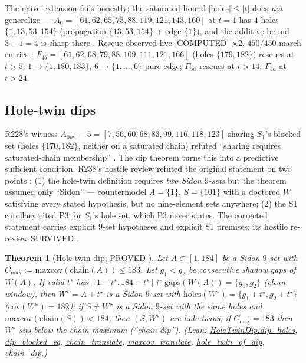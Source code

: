 \documentclass[11pt,a4paper]{article}
\newtheorem{theorem}{Theorem}
\theoremstyle{definition}
\begin{document}
The naive extension fails honestly: the saturated bound
$|\mathrm{holes}|\le|t|$ does \emph{not} generalize ---
$A_0=[61,62,65,73,88,119,121,143,160]$ at $t=1$ has $4$ holes
$\{1,13,53,154\}$ (propagation $\{13,53,154\}$ + edge $\{1\}$), and
the additive bound $3+1=4$ is sharp there \cite{D233}.
Rescue observed live [COMPUTED] $\times2$, $450/450$ march entries
\cite{D233}: $F_{4b}=[61,62,68,79,88,109,111,121,166]$ (holes
$\{179,182\}$) rescues at $t>5$: $1\!\to\!\{1,180,183\}$,
$6\!\to\!\{1,\dots,6\}$ pure edge; $F_{5a}$ rescues at $t>14$;
$F_{4a}$ at $t>24$.

\subsection{Hole-twin dips}
\label{sec:dip}

R228's witness $A_{0w1}-5=[7,56,60,68,83,99,116,118,123]$ sharing
$S_1$'s blocked set (holes $\{170,182\}$, neither on a saturated chain)
refuted ``sharing requires saturated-chain membership''
\cite{D231}. The dip theorem turns this into a predictive sufficient
condition. R238's hostile review refuted the original statement on two
points \cite{D238}: (1) the hole-twin definition requires \emph{two
Sidon $9$-sets} but the theorem assumed only ``Sidon'' --- countermodel
$A=\{1\}$, $S=\{101\}$ with a doctored $W$ satisfying every stated
hypothesis, but no nine-element sets anywhere; (2) the S1 corollary
cited P3 for $S_1$'s hole set, which P3 never states. The corrected
statement carries explicit $9$-set hypotheses and explicit S1 premises;
its hostile re-review SURVIVED \cite{D246}.

\begin{theorem}[Hole-twin dip; PROVED \cite{D250}]
  \label{thm:dip}
  Let $A\subset[1,184]$ be a Sidon $9$-set with
  $C_{\max}:=\mathrm{maxcov}(\mathrm{chain}(A))\le183$. Let
  $g_1<g_2$ be consecutive shadow gaps of $W(A)$. If valid $t^\star$
  has $[1-t^\star,184-t^\star]\cap\mathrm{gaps}(W(A))=\{g_1,g_2\}$
  (clean window), then $W^\star=A+t^\star$ is a Sidon $9$-set with
  $\mathrm{holes}(W^\star)=\{g_1+t^\star,g_2+t^\star\}$
  ($\mathrm{cov}(W^\star)=182$); if $S\ne W^\star$ is a Sidon $9$-set
  with the same holes and $\mathrm{maxcov}(\mathrm{chain}(S))<184$,
  then $(S,W^\star)$ are hole-twins; if $C_{\max}=183$ then $W^\star$
  sits below the chain maximum (``chain dip'').
  (Lean: \url{HoleTwinDip.dip_holes},
  \url{dip_blocked_eq}, \url{chain_translate},
  \url{maxcov_translate}, \url{hole_twin_of_dip},
  \url{chain_dip}.)
\end{theorem}
\end{document}
